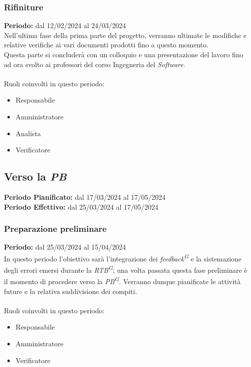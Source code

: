 \documentclass[5pt]{article}
\begin{document}
    
    \subsubsection{Rifiniture}
      \textbf{Periodo:} dal 12/02/2024 al 24/03/2024 
      \vspace{0.3cm} \\
      Nell'ultima fase della prima parte del progetto, verranno ultimate le modifiche e relative verifiche ai vari documenti 
      prodotti fino a questo momento. \\
      Questa parte si concluderà con un colloquio e una presentazione del lavoro fino ad ora svolto 
      ai professori del corso Ingegneria del \textit{Software}.\\\\
      Ruoli coinvolti in questo periodo:
      \begin{itemize}
          \item Responsabile
          \item Amministratore
          \item Analista
          \item Verificatore
      \end{itemize}

  
  \subsection{Verso la \textit{PB}}
    \textbf{Periodo Pianificato:} dal 17/03/2024 al 17/05/2024\\
    \textbf{Periodo Effettivo:} dal 25/03/2024 al 17/05/2024
    \subsubsection{Preparazione preliminare}
      \textbf{Periodo:} dal 25/03/2024 al 15/04/2024 
      \vspace{0.3cm} \\
      In questo periodo l'obiettivo sarà l'integrazione dei \textit{feedback\textsuperscript{G}} e la sistemazione degli errori emersi durante la \textit{RTB\textsuperscript{G}}; 
      una volta passata questa fase preliminare è il momento di procedere verso la \textit{PB\textsuperscript{G}}.
      Verranno dunque pianificate le attività future e la relativa suddivisione dei compiti.\\\\
      Ruoli coinvolti in questo periodo:
      \begin{itemize}
          \item Responsabile
          \item Amministratore
          \item Verificatore
      \end{itemize}
    
\end{document}
